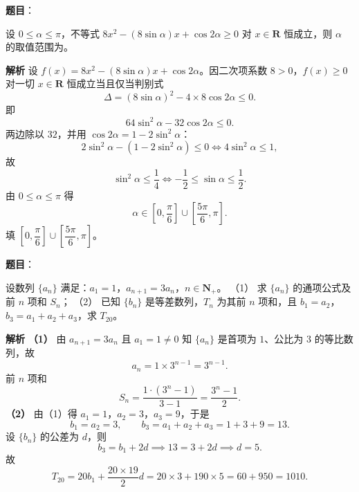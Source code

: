 \begin{answer}

\textbf{题目}：

设 $0\leqslant\alpha\leqslant\pi$，不等式 $8x^2-(8\sin\alpha)x+\cos2\alpha\geqslant0$ 对 $x\in\mathbf R$ 恒成立，则 $\alpha$ 的取值范围为\gkblank{}。

\textbf{解析}
设 $f(x)=8x^2-(8\sin\alpha)x+\cos2\alpha$。因二次项系数 $8>0$，$f(x)\geqslant0$ 对一切 $x\in\mathbf R$ 恒成立当且仅当判别式
\nopagebreak[4]
\[\Delta=(8\sin\alpha)^2-4\times8\cos2\alpha\leqslant0.\]
即
\nopagebreak[4]
\[64\sin^2\alpha-32\cos2\alpha\leqslant0.\]
两边除以 $32$，并用 $\cos2\alpha=1-2\sin^2\alpha$：
\nopagebreak[4]
\[2\sin^2\alpha-(1-2\sin^2\alpha)\leqslant0\iff4\sin^2\alpha\leqslant1,\]
故
\nopagebreak[4]
\[\sin^2\alpha\leqslant\frac14\iff-\frac12\leqslant\sin\alpha\leqslant\frac12.\]
由 $0\leqslant\alpha\leqslant\pi$ 得
\nopagebreak[4]
\[\alpha\in\left[0,\frac\pi6\right]\cup\left[\frac{5\pi}6,\pi\right].\]
填 $\left[0,\dfrac\pi6\right]\cup\left[\dfrac{5\pi}6,\pi\right]$。


\end{answer}
\begin{answer}

\textbf{题目}：

设数列 $\{a_n\}$ 满足：$a_1=1$，$a_{n+1}=3a_n$，$n\in\mathbf N_+$。
（1） 求 $\{a_n\}$ 的通项公式及前 $n$ 项和 $S_n$；
（2） 已知 $\{b_n\}$ 是等差数列，$T_n$ 为其前 $n$ 项和，且 $b_1=a_2$，$b_3=a_1+a_2+a_3$，求 $T_{20}$。

\textbf{解析}
\textbf{（1）} 由 $a_{n+1}=3a_n$ 且 $a_1=1\neq0$ 知 $\{a_n\}$ 是首项为 $1$、公比为 $3$ 的等比数列，故
\nopagebreak[4]
\[a_n=1\times3^{n-1}=3^{n-1}.\]
前 $n$ 项和
\nopagebreak[4]
\[S_n=\frac{1\cdot(3^n-1)}{3-1}=\frac{3^n-1}2.\]
\textbf{（2）} 由（1）得 $a_1=1$，$a_2=3$，$a_3=9$，于是
\nopagebreak[4]
\[b_1=a_2=3,\qquad b_3=a_1+a_2+a_3=1+3+9=13.\]
设 $\{b_n\}$ 的公差为 $d$，则
\nopagebreak[4]
\[b_3=b_1+2d\implies13=3+2d\implies d=5.\]
故
\nopagebreak[4]
\[T_{20}=20b_1+\frac{20\times19}2d=20\times3+190\times5=60+950=1010.\]



\end{answer}
